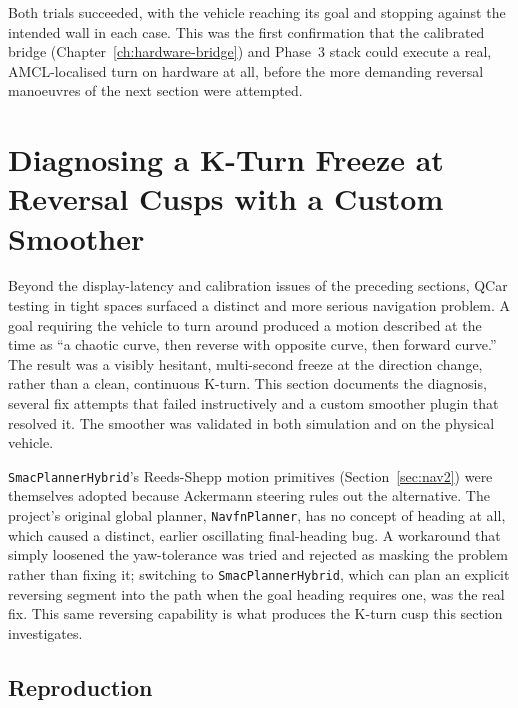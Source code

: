 Both trials succeeded, with the vehicle reaching its goal and stopping
against the intended wall in each case. This was the first
confirmation that the calibrated bridge (Chapter~\ref{ch:hardware-bridge})
and Phase~3 stack could execute a real, AMCL-localised turn on
hardware at all, before the more demanding reversal manoeuvres of the
next section were attempted.

\section{Diagnosing a K-Turn Freeze at Reversal Cusps with a Custom Smoother}
\label{sec:cusp-freeze}

Beyond the display-latency and calibration issues of the preceding
sections, QCar testing in tight spaces surfaced a distinct
and more serious navigation problem. A goal requiring the vehicle to
turn around produced a motion described at the time as ``a chaotic curve, then
reverse with opposite curve, then forward curve.'' The result was a
visibly hesitant, multi-second freeze at the direction change, rather
than a clean, continuous K-turn. This section documents the
diagnosis, several fix attempts that failed instructively and a
custom smoother plugin that resolved it. The smoother was validated
in both simulation and on the physical vehicle.

\texttt{SmacPlannerHybrid}'s Reeds-Shepp motion primitives
(Section~\ref{sec:nav2}) were themselves adopted because Ackermann
steering rules out the alternative. The project's original global
planner, \texttt{NavfnPlanner}, has no concept of heading at all,
which caused a distinct, earlier oscillating final-heading bug. A
workaround that simply loosened the yaw-tolerance was tried and
rejected as masking the problem rather than fixing it; switching to
\texttt{SmacPlannerHybrid}, which can plan an explicit reversing
segment into the path when the goal heading requires one, was the real
fix. This same reversing capability is what produces the K-turn cusp
this section investigates.

\subsection{Reproduction}
\label{sec:cusp-repro}

